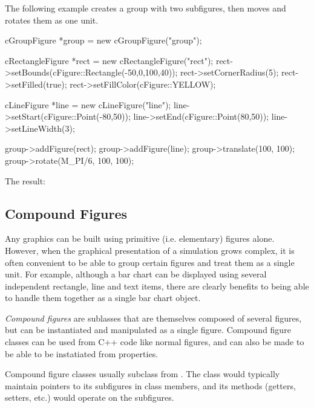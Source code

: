 The following example creates a group with two subfigures, then moves and
rotates them as one unit.

\begin{cpp}
cGroupFigure *group = new cGroupFigure("group");

cRectangleFigure *rect = new cRectangleFigure("rect");
rect->setBounds(cFigure::Rectangle(-50,0,100,40));
rect->setCornerRadius(5);
rect->setFilled(true);
rect->setFillColor(cFigure::YELLOW);

cLineFigure *line = new cLineFigure("line");
line->setStart(cFigure::Point(-80,50));
line->setEnd(cFigure::Point(80,50));
line->setLineWidth(3);

group->addFigure(rect);
group->addFigure(line);
group->translate(100, 100);
group->rotate(M_PI/6, 100, 100);
\end{cpp}


The result:

\begin{center}

\end{center}


\subsection{Compound Figures}
\label{sec:graphics:compound-figures}

Any graphics can be built using primitive (i.e. elementary) figures
alone. However, when the graphical presentation of a simulation
grows complex, it is often convenient to be able to group certain
figures and treat them as a single unit. For example, although
a bar chart can be displayed using several independent rectangle,
line and text items, there are clearly benefits to being able to
handle them together as a single bar chart object.

\textit{Compound figures} are  sublasses that
are themselves composed of several figures, but can be instantiated
and manipulated as a single figure. Compound figure classes
can be used from C++ code like normal figures, and can also
be made to be able to be instatiated from  properties.

Compound figure classes usually subclass from .
The class would typically maintain pointers to its subfigures in
class members, and its methods (getters, setters, etc.) would operate
on the subfigures.

